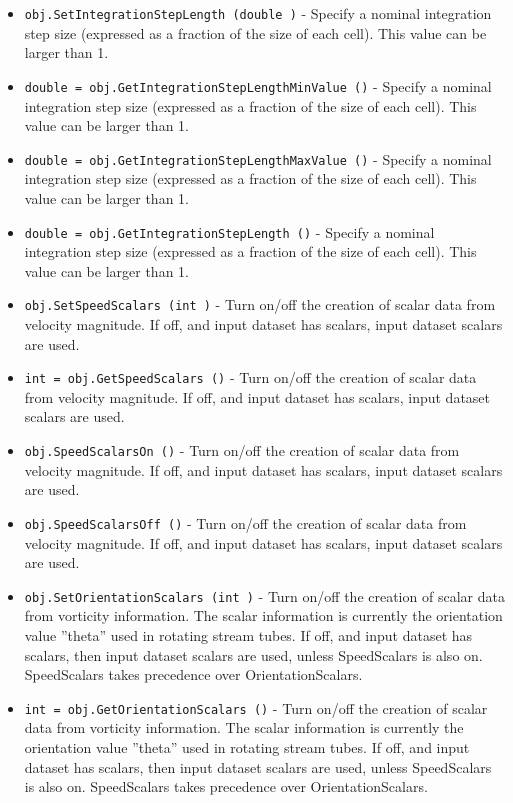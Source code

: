 \begin{itemize}
\item  \verb|obj.SetIntegrationStepLength (double )| -  Specify a nominal integration step size (expressed as a fraction of
 the size of each cell). This value can be larger than 1.

\item  \verb|double = obj.GetIntegrationStepLengthMinValue ()| -  Specify a nominal integration step size (expressed as a fraction of
 the size of each cell). This value can be larger than 1.

\item  \verb|double = obj.GetIntegrationStepLengthMaxValue ()| -  Specify a nominal integration step size (expressed as a fraction of
 the size of each cell). This value can be larger than 1.

\item  \verb|double = obj.GetIntegrationStepLength ()| -  Specify a nominal integration step size (expressed as a fraction of
 the size of each cell). This value can be larger than 1.

\item  \verb|obj.SetSpeedScalars (int )| -  Turn on/off the creation of scalar data from velocity magnitude. If off,
 and input dataset has scalars, input dataset scalars are used.

\item  \verb|int = obj.GetSpeedScalars ()| -  Turn on/off the creation of scalar data from velocity magnitude. If off,
 and input dataset has scalars, input dataset scalars are used.

\item  \verb|obj.SpeedScalarsOn ()| -  Turn on/off the creation of scalar data from velocity magnitude. If off,
 and input dataset has scalars, input dataset scalars are used.

\item  \verb|obj.SpeedScalarsOff ()| -  Turn on/off the creation of scalar data from velocity magnitude. If off,
 and input dataset has scalars, input dataset scalars are used.

\item  \verb|obj.SetOrientationScalars (int )| -  Turn on/off the creation of scalar data from vorticity information. 
 The scalar information is currently the orientation value ''theta''
 used in rotating stream tubes. If off, and input dataset has scalars,
 then input dataset scalars are used, unless SpeedScalars is also on.
 SpeedScalars takes precedence over OrientationScalars.

\item  \verb|int = obj.GetOrientationScalars ()| -  Turn on/off the creation of scalar data from vorticity information. 
 The scalar information is currently the orientation value ''theta''
 used in rotating stream tubes. If off, and input dataset has scalars,
 then input dataset scalars are used, unless SpeedScalars is also on.
 SpeedScalars takes precedence over OrientationScalars.


\end{itemize}
